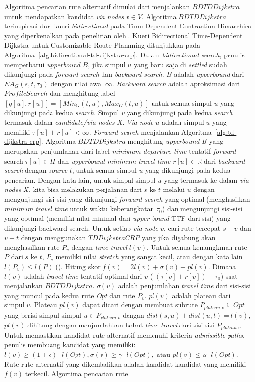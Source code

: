 Algoritma pencarian rute alternatif dimulai dari menjalankan $BDTDDijkstra$ untuk mendapatkan kandidat \textit{via nodes} $v\in V$. Algoritma $BDTDDijkstra$ terinspirasi dari kueri \textit{bidirectional} pada Time-Dependent Contraction Hierarchies yang diperkenalkan pada penelitian oleh \cite{Veit2013}. Kueri Bidirectional Time-Dependent Dijkstra untuk Customizable Route Plannning ditunjukkan pada Algoritma~\ref{alg:bidirectional-td-dijkstra-crp}. Dalam \textit{bidirectional search}, penulis memperbarui \textit{upperbound} $B$, jika simpul $u$ yang baru saja di \textit{settled} sudah dikunjungi pada \textit{forward search} dan \textit{backward search}. $B$ adalah \textit{upperbound} dari $EA_G(s,t,\tau_0)$ dengan nilai awal $\infty$. \textit{Backward search} adalah aproksimasi dari $ProfileSearch$ dan menghitung label $[q[u], r[u]]=[Min_G(t,u), Max_G(t,u)]$ untuk semua simpul $u$ yang dikunjungi pada kedua \textit{search}. Simpul $v$ yang dikunjungi pada kedua \textit{search} termasuk dalam \textit{candidate/via nodes} $X$. \textit{Via node} $u$ adalah simpul $u$ yang memiliki $\tau[u] + r[u] < \infty$. \textit{Forward search} menjalankan Algoritma~\ref{alg:td-dijkstra-crp}. Algoritma $BDTDDijkstra$ menghitung \textit{upperbound} $B$ yang merupakan penjumlahan dari label \textit{minimum departure time} tentatif \textit{forward} search $\tau[u]\in \Pi$ dan \textit{upperbound minimum travel time} $r[u]\in \mathbb{R}$ dari \textit{backward search} dengan \textit{source} $t$, untuk semua simpul $u$ yang dikunjungi pada kedua pencarian. Dengan kata lain, untuk simpul-simpul $u$ yang termasuk ke dalam \textit{via nodes} $X$, kita bisa melakukan perjalanan dari $s$ ke $t$ melalui $u$ dengan mengunjungi sisi-sisi yang dikunjungi \textit{forward search} yang optimal (menghasilkan \textit{minimum travel time } untuk waktu keberangkatan $\tau_0$) dan mengunjungi sisi-sisi yang optimal (memiliki nilai minimal dari \textit{upper bound} TTF dari sisi) yang dikunjungi backward search. Untuk setiap \textit{via node} $v$, cari rute tercepat $s-v$ dan $v-t$ dengan menggunakan $TDDijkstraCRP$ yang jika digabung akan menghasilkan rute $P_v$ dengan \textit{time travel} $l(v)$. Untuk semua kemungkinan rute $P$  dari $s$ ke $t$, $P_v$ memiliki nilai \textit{stretch} yang sangat kecil, atau dengan kata lain $l(P_v)\leq l(P)$ (\cite{Abraham2010}). Hitung skor $f(v)=2l(v)+\sigma(v)-pl(v)$. Dimana $l(v)$ adalah \textit{travel time } tentatif optimal dari $v$  ( $(\tau[v]+r[v])-\tau_0$) saat menjalankan $BDTDDijkstra$. $\sigma(v)$ adalah penjumlahan \textit{travel time} dari sisi-sisi yang muncul pada kedua rute \textit{Opt} dan rute $P_v$. $pl(v)$ adalah plateau dari simpul $v$. Plateau $pl(v)$ dapat dicari dengan membuat subrute $P_{plateau\_v}\subseteq Opt$ yang berisi simpul-simpul $u\in P_{plateau\_v}$ dengan $dist(s,u)+dist(u,t)=l(v)$, $pl(v)$ dihitung dengan menjumlahkan bobot \textit{time travel} dari sisi-sisi $P_{plateau\_v}$. Untuk memastikan kandidat rute alternatif memenuhi kriteria \textit{admissible paths}, penulis membuang kandidat yang memiliki: $l(v)\geq (1+\epsilon)\cdot l(Opt), \sigma(v)\geq\gamma \cdot l(Opt), \text{ atau } pl(v)\leq \alpha \cdot l(Opt)$. Rute-rute alternatif yang dikembalikan adalah kandidat-kandidat yang memiliki $f(v)$ terkecil. Algortima pencarian rute 